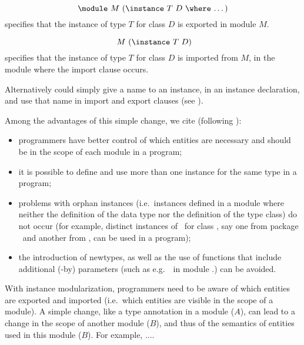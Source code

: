   \[ \text{\module\ $M$ (\instance\ $T$ $D$ \where\ \ldots)} \]
specifies that the instance of type $T$ for class $D$ is exported in
module $M$. 

  \[ \text{\ $M$ (\instance\ $T$ $D$)} \]
specifies that the instance of type $T$ for class $D$ is imported from
$M$, in the module where the import clause occurs.

Alternatively could simply give a name to an instance, in an instance
declaration, and use that name in import and export clauses (see
\cite{Controlling-scope-instances}).

Among the advantages of this simple change, we cite (following
\cite{Controlling-scope-instances}):

\begin{itemize}

  \item programmers have better control of which entities are
    necessary and should be in the scope of each module in a program;

  \item it is possible to define and use more than one instance for
    the same type in a program;

  \item problems with orphan instances (i.e.~instances defined in a
    module where neither the definition of the data type nor the
    definition of the type class) do not occur (for example, distinct
    instances of \Either\ for class \Monad, say one from package
    \mtl\ and another from \transformers, can be used in a program);

  \item the introduction of newtypes, as well as the use of functions
    that include additional (-by) parameters (such as e.g.~\sortBy\ in
    module \Data.\List) can be avoided.

\end{itemize}

With instance modularization, programmers need to be aware of which
entities are exported and imported (i.e.~which entities are visible in
the scope of a module). A simple change, like a type annotation in a
module ($A$), can lead to a change in the scope of another module
($B$), and thus of the semantics of entities used in this module
($B$). For example, ....





